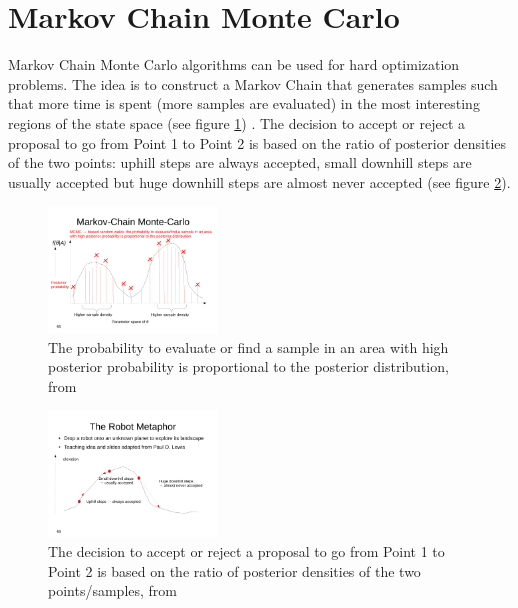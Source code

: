 \documentclass[10pt,twocolumn,letterpaper]{article}
\begin{document}
\section{Markov Chain Monte Carlo} \label{sec:MCMC}

Markov Chain Monte Carlo algorithms can be used for hard optimization problems. The idea is to construct a Markov Chain that generates samples such that more time is spent (more samples are evaluated) in the most interesting regions of the state space (see figure \ref{fig:MCMC1}) \cite{MCMC}. The decision to accept or reject a proposal to go from Point 1 to Point 2 is based on the ratio of posterior densities of the two points: uphill steps are always accepted, small downhill steps are usually accepted but huge downhill steps are almost never accepted (see figure \ref{fig:MCMC2}). 


\begin{figure}
	\begin{center}
		\includegraphics[trim = 0cm 1.5cm 1cm 5.4cm, clip, width=0.4\textwidth]{lecture12-seiten-46}
	\end{center}
	\caption{The probability to evaluate or find a sample in an area with high posterior probability is proportional to the posterior distribution, from \cite{MCMC}}
	\label{fig:MCMC1}
\end{figure}

\begin{figure}
	\begin{center}
		\includegraphics[trim = 0cm 4cm 1cm 7cm, clip, width=0.4\textwidth]{lecture12-seiten-48}
	\end{center}
	\caption{The decision to accept or reject a proposal to go from Point 1 to Point 2 is based on the ratio of posterior densities of the two points/samples, from \cite{MCMC}}
	\label{fig:MCMC2}
\end{figure}
\end{document}
